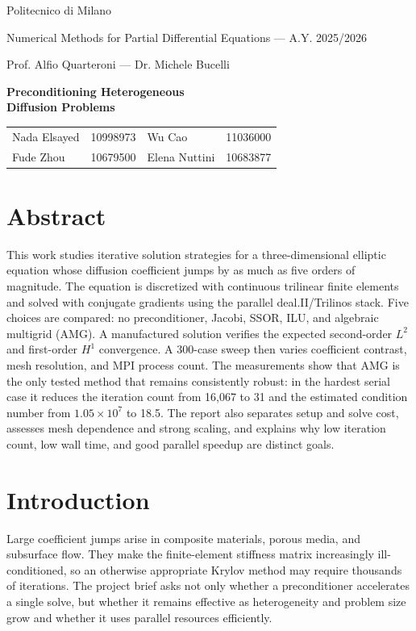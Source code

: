 \documentclass[10pt,a4paper]{article}
\makeatletter
\newcommand{\reportauthors}{%
  \begin{tabular}{@{}lr@{\qquad\qquad}lr@{}}
    Nada Elsayed & 10998973 & Wu Cao & 11036000\\
    Fude Zhou & 10679500 & Elena Nuttini & 10683877
  \end{tabular}}
\makeatother
\begin{document}
\thispagestyle{plain}
\begin{center}
  {\large Politecnico di Milano}\par
  {\normalsize Numerical Methods for Partial Differential Equations --- A.Y. 2025/2026}\par
  {\small Prof. Alfio Quarteroni --- Dr. Michele Bucelli}\par
  \vspace{1.5cm}
  {\LARGE\bfseries Preconditioning Heterogeneous\\[0.15cm]Diffusion Problems}\par
  \vspace{0.55cm}
  {\large \reportauthors}\par
\end{center}

\section*{Abstract}
This work studies iterative solution strategies for a three-dimensional elliptic equation whose
diffusion coefficient jumps by as much as five orders of magnitude. The equation is discretized
with continuous trilinear finite elements and solved with conjugate gradients using the parallel
deal.II/Trilinos stack. Five choices are compared: no preconditioner, Jacobi, SSOR, ILU, and
algebraic multigrid (AMG). A manufactured solution verifies the expected second-order
$L^2$ and first-order $H^1$ convergence. A 300-case sweep then varies coefficient contrast,
mesh resolution, and MPI process count. The measurements show that AMG is the only tested
method that remains consistently robust: in the hardest serial case it reduces the iteration
count from 16,067 to 31 and the estimated condition number from $1.05\times10^7$ to 18.5.
The report also separates setup and solve cost, assesses mesh dependence and strong scaling,
and explains why low iteration count, low wall time, and good parallel speedup are distinct goals.

\section{Introduction}
Large coefficient jumps arise in composite materials, porous media, and subsurface flow. They
make the finite-element stiffness matrix increasingly ill-conditioned, so an otherwise appropriate
Krylov method may require thousands of iterations. The project brief asks not only whether a
preconditioner accelerates a single solve, but whether it remains effective as heterogeneity and
problem size grow and whether it uses parallel resources efficiently.
\end{document}
